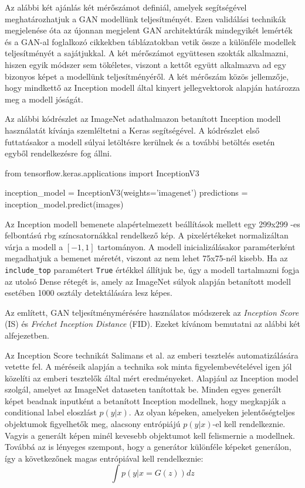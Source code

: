 Az alábbi két ajánlás két mérőszámot definiál, amelyek segítségével meghatározhatjuk a GAN modellünk teljesítményét. Ezen validálási technikák megjelenése óta az újonnan megjelent GAN architektúrák mindegyikét lemérték és a GAN-al foglalkozó cikkekben táblázatokban vetik össze a különféle modellek teljesítményét a sajátjukkal.
A két mérőszámot együttesen szokták alkalmazni, hiszen egyik módszer sem tökéletes, viszont a kettőt együtt alkalmazva ad egy bizonyos képet a modellünk teljesítményéről.
A két mérőszám közös jellemzője, hogy mindkettő az Inception modell által kinyert jellegvektorok alapján határozza meg a modell jóságát.

Az alábbi kódrészlet az ImageNet adathalmazon betanított Inception modell használatát kívánja szemléltetni a Keras segítségével. A kódrészlet első futtatásakor a modell súlyai letöltésre kerülnek és a további betöltés esetén egyből rendelkezésre fog állni.

\begin{python}
	from tensorflow.keras.applications import InceptionV3
	
	inception_model = InceptionV3(weights='imagenet')
	predictions = inception_model.predict(images)
\end{python}

Az Inception modell bemenete alapértelmezett beállítások mellett egy 299x299 -es felbontású rbg színcsatornákkal rendelkező kép. A pixelértékeket normalizáltan várja a modell a $[-1, 1]$ tartományon. A modell inicializálásakor paraméterként megadhatjuk a bemenet méretét, viszont az nem lehet 75x75-nél kisebb. Ha az \texttt{include\_top} paramétert \texttt{True} értékkel állítjuk be, úgy a modell tartalmazni fogja az utolsó Dense rétegét is, amely az ImageNet súlyok alapján betanított modell esetében 1000 osztály detektálására lesz képes.

Az említett, GAN teljesítménymérésére használatos módszerek az \textit{Inception Score} (IS) és \textit{Fréchet Inception Distance} (FID). Ezeket kívánom bemutatni az alábbi két alfejezetben.

Az Inception Score \cite{salimans2016improved} technikát Salimans et al. az emberi tesztelés automatizálására vetette fel. A méréseik alapján a technika sok minta figyelembevételével igen jól közelíti az emberi tesztelők által mért eredményeket.
Alapjául az Inception model szolgál, amelyet az ImageNet dataseten tanítottak be. Minden egyes generált képet beadnak inputként a betanított Inception modellnek, hogy megkapják a conditional label eloszlást $p(y|x)$. Az olyan képeken, amelyeken jelentőségteljes objektumok figyelhetők meg, alacsony entrópiájú $p(y|x)$-el kell rendelkeznie. Vagyis a generált képen minél kevesebb objektumot kell felismernie a modellnek.
Továbbá az is lényeges szempont, hogy a generátor különféle képeket generálon, így a következőnek magas entrópiával kell rendelkeznie:
$$ \int p(y|x = G(z))dz $$

